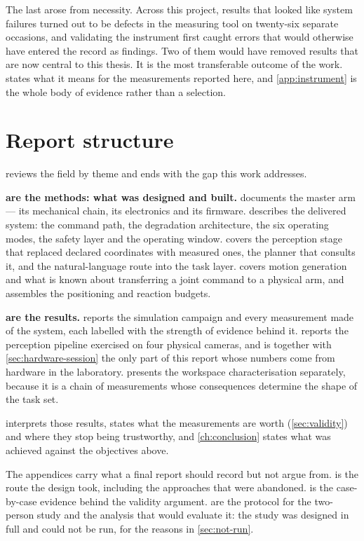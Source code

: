 The last arose from necessity. Across this project, results that looked like
system failures turned out to be defects in the measuring tool on
twenty-six separate occasions, and validating the instrument first caught
errors that would otherwise have entered the record as findings. Two of them
would have removed results that are now central to this thesis. It is the most
transferable outcome of the work.  states what it means for
the measurements reported here, and \cref{app:instrument} is the whole body of
evidence rather than a selection.

\section{Report structure}

 reviews the field by theme and ends with the gap this
work addresses.

\textbf{ are the methods:
what was designed and built.}  documents the master arm --- its
mechanical chain, its electronics and its firmware. 
describes the delivered system: the command path, the degradation
architecture, the six operating modes, the safety layer and the operating
window.  covers the perception stage that replaced
declared coordinates with measured ones, the planner that consults it, and
the natural-language route into the task layer.  covers
motion generation and what is known about transferring a joint command to a
physical arm, and assembles the positioning and reaction budgets.

\textbf{ are the results.}
 reports the simulation campaign and every measurement made
of the system, each labelled with the strength of evidence behind it.
 reports the perception pipeline exercised on four physical
cameras, and is together with \cref{sec:hardware-session} the only part of
this report whose numbers come from hardware in the laboratory.
 presents the workspace characterisation separately,
because it is a chain of measurements whose consequences determine the shape
of the task set.

 interprets those results, states what the measurements
are worth (\cref{sec:validity}) and where they stop being trustworthy, and
\cref{ch:conclusion} states what was achieved against the objectives above.

The appendices carry what a final report should record but not argue from.
 is the route the design took, including the approaches
that were abandoned.  is the case-by-case evidence behind
the validity argument.  are the protocol for the
two-person study and the analysis that would evaluate it: the study was
designed in full and could not be run, for the reasons in
\cref{sec:not-run}.